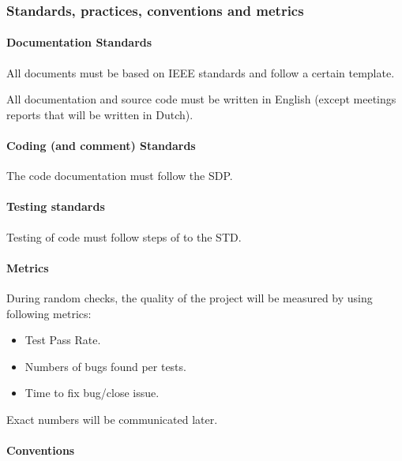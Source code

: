 \documentclass[12pt]{article}
\begin{document}
\subsubsection{Standards, practices, conventions and
metrics}\label{standards-practices-conventions-and-metrics}

\paragraph{Documentation Standards}\label{documentation-standards}

All documents must be based on IEEE standards and follow a certain
template.

All documentation and source code must be written in English (except
meetings reports that will be written in Dutch).

\paragraph{Coding (and comment)
Standards}\label{coding-and-comment-standards}

The code documentation must follow the SDP.

\paragraph{Testing standards}\label{testing-standards}

Testing of code must follow steps of to the STD.

\paragraph{Metrics}\label{metrics}

During random checks, the quality of the project will be measured by
using following metrics:

\begin{itemize}
\itemsep1pt\parskip0pt
\item
  Test Pass Rate.
\item
  Numbers of bugs found per tests.
\item
  Time to fix bug/close issue.
\end{itemize}

Exact numbers will be communicated later.

\paragraph{Conventions}\label{conventions}
\end{document}
